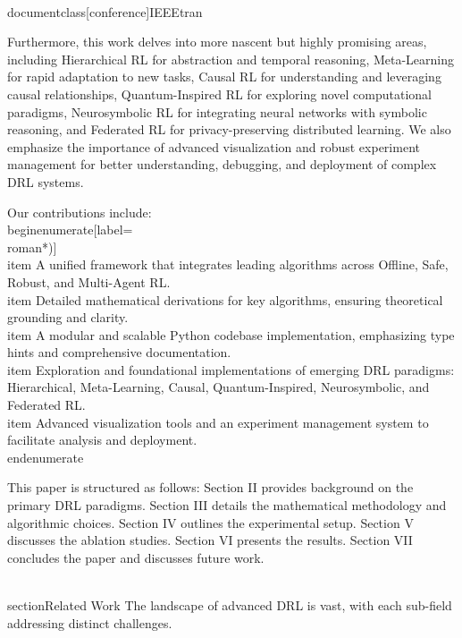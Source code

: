 \\documentclass[conference]{IEEEtran}
\begin{document}
Furthermore, this work delves into more nascent but highly promising areas, including Hierarchical RL for abstraction and temporal reasoning, Meta-Learning for rapid adaptation to new tasks, Causal RL for understanding and leveraging causal relationships, Quantum-Inspired RL for exploring novel computational paradigms, Neurosymbolic RL for integrating neural networks with symbolic reasoning, and Federated RL for privacy-preserving distributed learning. We also emphasize the importance of advanced visualization and robust experiment management for better understanding, debugging, and deployment of complex DRL systems.

Our contributions include:
\\begin{enumerate}[label=\\roman*)]
    \\item A unified framework that integrates leading algorithms across Offline, Safe, Robust, and Multi-Agent RL.
    \\item Detailed mathematical derivations for key algorithms, ensuring theoretical grounding and clarity.
    \\item A modular and scalable Python codebase implementation, emphasizing type hints and comprehensive documentation.
    \\item Exploration and foundational implementations of emerging DRL paradigms: Hierarchical, Meta-Learning, Causal, Quantum-Inspired, Neurosymbolic, and Federated RL.
    \\item Advanced visualization tools and an experiment management system to facilitate analysis and deployment.
\\end{enumerate}

This paper is structured as follows: Section II provides background on the primary DRL paradigms. Section III details the mathematical methodology and algorithmic choices. Section IV outlines the experimental setup. Section V discusses the ablation studies. Section VI presents the results. Section VII concludes the paper and discusses future work.

\\section{Related Work}
The landscape of advanced DRL is vast, with each sub-field addressing distinct challenges.
\end{document}
